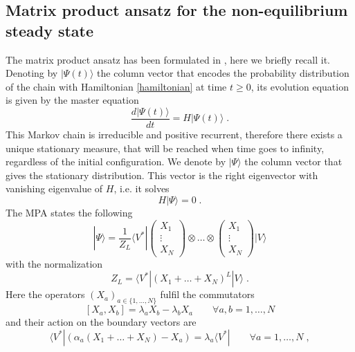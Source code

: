 \documentclass[10pt]{article}
\numberwithin{equation}{section}
\numberwithin{equation}{subsection}
\newcommand{\co}{\;,}
\newcommand{\dt}{\;.}
\begin{document}
\subsection{Matrix product ansatz for the non-equilibrium steady state}
The matrix product ansatz has been formulated in \cite{vanicat2017exact}, here we briefly recall it.
 Denoting by $|\Psi(t)\rangle$ the column vector that encodes the probability distribution of the chain with Hamiltonian \eqref{hamiltonian} at time $t\geq 0$, its evolution equation is given by 
 the master equation
\begin{equation}
    \frac{d|{\Psi}(t)\rangle}{dt}=H|{\Psi}(t)\rangle\dt
\end{equation}
This Markov chain is irreducible and positive recurrent, therefore there exists a unique stationary measure, that will be reached when time goes to infinity, regardless of the initial configuration. 
We denote by $|\Psi\rangle$ the column vector that gives the stationary distribution. This vector is the right eigenvector with vanishing eigenvalue of $H$, i.e. it solves 
\begin{equation}\label{definition-SteadyStateH}
	H|\Psi\rangle =0\dt
\end{equation}
The MPA states the following
\begin{equation}
	|\Psi\rangle=\frac{1}{Z_{L}}\langle V^{*}|\begin{pmatrix}
		X_{1}\\
		\vdots\\
		X_{N}
	\end{pmatrix}\otimes \ldots\otimes \begin{pmatrix}
		X_{1}\\
		\vdots\\
		X_{N}
	\end{pmatrix}|V\rangle
\end{equation}
with the normalization 
\begin{equation}
	Z_{L}=\langle V^{*}|(X_{1}+\ldots +X_{N})^{L}|V\rangle\dt
\end{equation}
Here the operators $(X_{a})_{a\in \{1,\ldots,N\}}$ fulfil the commutators
\begin{equation}\label{bulk}
	\left[X_{a},X_{b}\right]=\lambda_{a}X_{b}-\lambda_{b}X_{a}\qquad\forall a,b=1,\ldots,N
\end{equation}
and their action on the boundary vectors are
\begin{equation}\label{leftBoundary}
	\langle V^{*}|\left(\alpha_{a}(X_{1}+\ldots+X_{N})-X_{a}\right)=\lambda_{a}\langle V^{*}|\qquad\forall a=1,\ldots,N\co
\end{equation}
\end{document}
